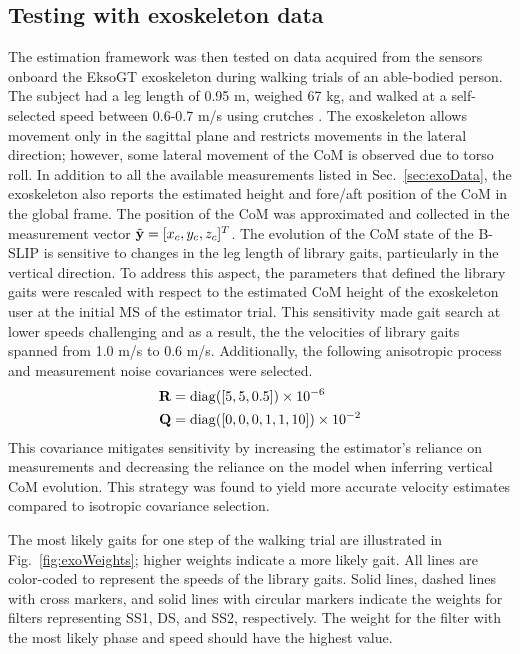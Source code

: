 \subsection{Testing with exoskeleton data}\label{sec:IMM_human}

The estimation framework was then tested on data acquired from the sensors onboard the EksoGT exoskeleton during walking trials of an able-bodied person. The subject had a leg length of 0.95 m, weighed 67 kg, and walked at a self-selected speed between 0.6-0.7 m/s using crutches \cite{gambon2019characterizing}. The exoskeleton allows movement only in the sagittal plane and restricts movements in the lateral direction; however, some lateral movement of the CoM is observed due to torso roll. In addition to all the available measurements listed in Sec.~\ref{sec:exoData}, the exoskeleton also reports the estimated height and fore/aft position of the CoM in the global frame. The position of the CoM was approximated and collected in the measurement vector $ \tilde{\mathbf{y}} = [x_c ,y_c ,z_c]^T $. The evolution of the CoM state of the B-SLIP is sensitive to changes in the leg length of library gaits, particularly in the vertical direction. To address this aspect, the parameters that defined the library gaits were rescaled with respect to the estimated CoM height of the exoskeleton user at the initial MS of the estimator trial. This sensitivity made gait search at lower speeds challenging and as a result, the the velocities of library gaits spanned from 1.0 m/s to 0.6 m/s. Additionally, the following anisotropic process and measurement noise covariances were selected.
\begin{align}
		\mathbf{R} &= {\rm diag}([5,5,0.5])\times 10^{-6} \\
		\mathbf{Q} &={\rm diag}([0,0,0,1,1,10])\times 10^{-2}
\end{align}
This covariance mitigates sensitivity by increasing the estimator's reliance on measurements and decreasing the reliance on the model when inferring vertical CoM evolution. This strategy was found to yield more accurate velocity estimates compared to isotropic covariance selection. 

The most likely gaits for one step of the walking trial are illustrated in Fig.~\ref{fig:exoWeights}; higher weights indicate a more likely gait. All lines are color-coded to represent the speeds of the library gaits. Solid lines, dashed lines with cross markers, and solid lines with circular markers indicate the weights for filters representing SS1, DS, and SS2, respectively. The weight for the filter with the most likely phase and speed should have the highest value. 

